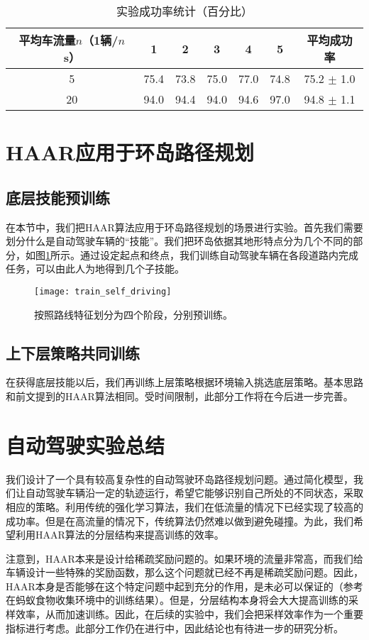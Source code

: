   \begin{table}[h!]
  \centering
  \caption{实验成功率统计（百分比）}
  \label{table:experiment_phaseI}
  \begin{tabular}[c]{|c||c|c|c|c|c||c|}
  \hline
  \textbf{平均车流量$n$（1辆/$n$s）} & \textbf{1}& \textbf{2}& \textbf{3}& \textbf{4}& \textbf{5}& \textbf{平均成功率}\\
  \hline
  5 & 75.4 & 73.8 & 75.0 & 77.0 & 74.8 & 75.2 $\pm$ 1.0 \\ \hline
  20 & 94.0 & 94.4 & 94.0 & 94.6 & 97.0 & 94.8 $\pm$ 1.1 \\ \hline
  \end{tabular}
  \end{table}
  
\section{HAAR应用于环岛路径规划}
\subsection{底层技能预训练}
在本节中，我们把HAAR算法应用于环岛路径规划的场景进行实验。首先我们需要划分什么是自动驾驶车辆的``技能''。我们把环岛依据其地形特点分为几个不同的部分，如图\ref{fig:train_self_driving}所示。通过设定起点和终点，我们训练自动驾驶车辆在各段道路内完成任务，可以由此人为地得到几个子技能。

      \begin{figure}[h] %
        \centering
        \texttt{[image: train\_self\_driving]}
        \caption{按照路线特征划分为四个阶段，分别预训练。}
        \label{fig:train_self_driving}
      \end{figure}

\subsection{上下层策略共同训练}
在获得底层技能以后，我们再训练上层策略根据环境输入挑选底层策略。基本思路和前文提到的HAAR算法相同。受时间限制，此部分工作将在今后进一步完善。

\section{自动驾驶实验总结}
我们设计了一个具有较高复杂性的自动驾驶环岛路径规划问题。通过简化模型，我们让自动驾驶车辆沿一定的轨迹运行，希望它能够识别自己所处的不同状态，采取相应的策略。利用传统的强化学习算法，我们在低流量的情况下已经实现了较高的成功率。但是在高流量的情况下，传统算法仍然难以做到避免碰撞。为此，我们希望利用HAAR算法的分层结构来提高训练的效率。

注意到，HAAR本来是设计给稀疏奖励问题的。如果环境的流量非常高，而我们给车辆设计一些特殊的奖励函数，那么这个问题就已经不再是稀疏奖励问题。因此，HAAR本身是否能够在这个特定问题中起到充分的作用，是未必可以保证的（参考在蚂蚁食物收集环境中的训练结果）。但是，分层结构本身将会大大提高训练的采样效率，从而加速训练。因此，在后续的实验中，我们会把采样效率作为一个重要指标进行考虑。此部分工作仍在进行中，因此结论也有待进一步的研究分析。


